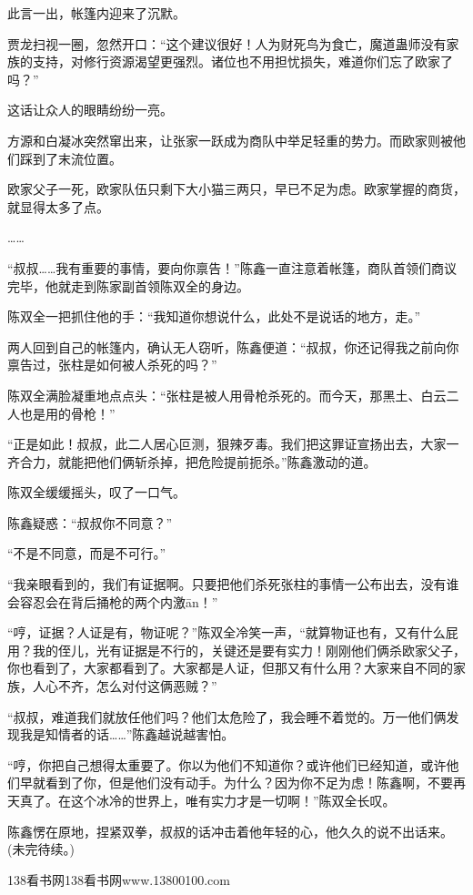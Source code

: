 \begin{this_body}
此言一出，帐篷内迎来了沉默。

贾龙扫视一圈，忽然开口：“这个建议很好！人为财死鸟为食亡，魔道蛊师没有家族的支持，对修行资源渴望更强烈。诸位也不用担忧损失，难道你们忘了欧家了吗？”

这话让众人的眼睛纷纷一亮。

方源和白凝冰突然窜出来，让张家一跃成为商队中举足轻重的势力。而欧家则被他们踩到了末流位置。

欧家父子一死，欧家队伍只剩下大小猫三两只，早已不足为虑。欧家掌握的商货，就显得太多了点。

……

“叔叔……我有重要的事情，要向你禀告！”陈鑫一直注意着帐篷，商队首领们商议完毕，他就走到陈家副首领陈双全的身边。

陈双全一把抓住他的手：“我知道你想说什么，此处不是说话的地方，走。”

两人回到自己的帐篷内，确认无人窃听，陈鑫便道：“叔叔，你还记得我之前向你禀告过，张柱是如何被人杀死的吗？”

陈双全满脸凝重地点点头：“张柱是被人用骨枪杀死的。而今天，那黑土、白云二人也是用的骨枪！”

“正是如此！叔叔，此二人居心叵测，狠辣歹毒。我们把这罪证宣扬出去，大家一齐合力，就能把他们俩斩杀掉，把危险提前扼杀。”陈鑫激动的道。

陈双全缓缓摇头，叹了一口气。

陈鑫疑惑：“叔叔你不同意？”

“不是不同意，而是不可行。”

“我亲眼看到的，我们有证据啊。只要把他们杀死张柱的事情一公布出去，没有谁会容忍会在背后捅枪的两个内激ān！”

“哼，证据？人证是有，物证呢？”陈双全冷笑一声，“就算物证也有，又有什么屁用？我的侄儿，光有证据是不行的，关键还是要有实力！刚刚他们俩杀欧家父子，你也看到了，大家都看到了。大家都是人证，但那又有什么用？大家来自不同的家族，人心不齐，怎么对付这俩恶贼？”

“叔叔，难道我们就放任他们吗？他们太危险了，我会睡不着觉的。万一他们俩发现我是知情者的话……”陈鑫越说越害怕。

“哼，你把自己想得太重要了。你以为他们不知道你？或许他们已经知道，或许他们早就看到了你，但是他们没有动手。为什么？因为你不足为虑！陈鑫啊，不要再天真了。在这个冰冷的世界上，唯有实力才是一切啊！”陈双全长叹。

陈鑫愣在原地，捏紧双拳，叔叔的话冲击着他年轻的心，他久久的说不出话来。(未完待续。)

138看书网138看书网www.13800100.com

\end{this_body}


